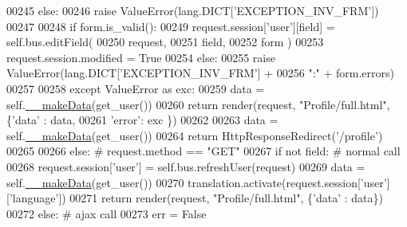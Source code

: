 \begin{DoxyCode}
00245                 \textcolor{keywordflow}{else}:
00246                     \textcolor{keywordflow}{raise} ValueError(lang.DICT[\textcolor{stringliteral}{'EXCEPTION\_INV\_FRM'}])
00247 
00248                 \textcolor{keywordflow}{if} form.is\_valid():
00249                     request.session[\textcolor{stringliteral}{'user'}][field] = self.bus.editField(
00250                                                         request, 
00251                                                         field, 
00252                                                         form )
00253                     request.session.modified = \textcolor{keyword}{True}
00254                 \textcolor{keywordflow}{else}:
00255                     \textcolor{keywordflow}{raise} ValueError(lang.DICT[\textcolor{stringliteral}{'EXCEPTION\_INV\_FRM'}] + 
00256                         \textcolor{stringliteral}{":"} + form.errors)
00257 
00258             \textcolor{keywordflow}{except} ValueError \textcolor{keyword}{as} exc:
00259                 data = self.\hyperlink{classProfile_1_1ProfileUnit_1_1UiFullProfile_ae0e9c54df37ab45f0d1c5d894181d10f}{\_\_makeData}(get\_user())
00260                 \textcolor{keywordflow}{return} render(request, \textcolor{stringliteral}{"Profile/full.html"}, \{\textcolor{stringliteral}{'data'} : data,
00261                                                              \textcolor{stringliteral}{'error'}: exc \})
00262 
00263             data = self.\hyperlink{classProfile_1_1ProfileUnit_1_1UiFullProfile_ae0e9c54df37ab45f0d1c5d894181d10f}{\_\_makeData}(get\_user())
00264             \textcolor{keywordflow}{return} HttpResponseRedirect(\textcolor{stringliteral}{'/profile'})
00265 
00266         \textcolor{keywordflow}{else}: \textcolor{comment}{# request.method == "GET"}
00267             \textcolor{keywordflow}{if} \textcolor{keywordflow}{not} field: \textcolor{comment}{# normal call}
00268                 request.session[\textcolor{stringliteral}{'user'}] = self.bus.refreshUser(request)
00269                 data = self.\hyperlink{classProfile_1_1ProfileUnit_1_1UiFullProfile_ae0e9c54df37ab45f0d1c5d894181d10f}{\_\_makeData}(get\_user())        
00270                 translation.activate(request.session[\textcolor{stringliteral}{'user'}][\textcolor{stringliteral}{'language'}])
00271                 \textcolor{keywordflow}{return} render(request, \textcolor{stringliteral}{"Profile/full.html"}, \{\textcolor{stringliteral}{'data'} : data\})
00272             \textcolor{keywordflow}{else}: \textcolor{comment}{# ajax call}
00273                 err = \textcolor{keyword}{False}

\end{DoxyCode}
